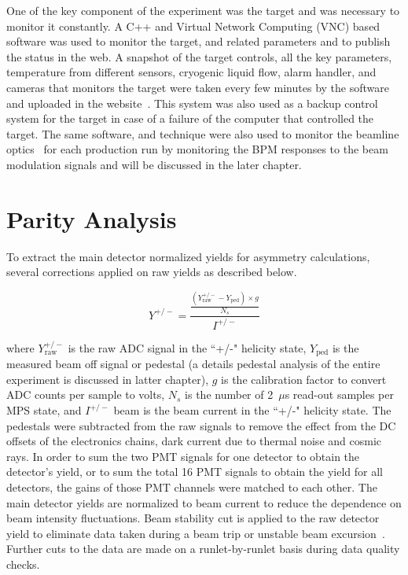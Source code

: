 One of the key component of the experiment was the target and was necessary to monitor it constantly. A C++ and Virtual Network Computing (VNC) based software was used to monitor the target, and related parameters and to publish the status in the web. 
A snapshot of the target controls, all the key parameters, temperature from different sensors, cryogenic liquid flow, alarm handler, and cameras that monitors the target were taken every few minutes by the software and uploaded in the website~\cite{website:target}. This system was also used as a backup control system for the target in case of a failure of the computer that controlled the target. 
The same software, and technique were also used to monitor the beamline optics~\cite{website:bmod} for each production run by monitoring the BPM responses to the beam modulation signals and will be discussed in the later chapter. 

\section{Parity Analysis}%
\label{Parity Analysis}


To extract the main detector normalized yields for asymmetry calculations, several corrections applied on raw yields as described below.

\begin{equation} \label{equ:yieldDefinition}
Y^{+/-} = \frac{\displaystyle \frac{(Y_{\textrm{raw}}^{+/-} - Y_{\textrm{ped}})\times g}{N_{s}} }{I^{+/-}}
\end{equation}

where $Y_{\textrm{raw}}^{+/-}$ is the raw ADC signal in the ``+/-" helicity state, $Y_{\textrm{ped}}$ is the measured beam off signal or pedestal (a details pedestal analysis of the entire experiment is discussed in latter chapter), $g$ is the calibration factor to convert ADC counts per sample to volts, $N_{s}$ is the number of 2~$\mu$s read-out samples per MPS state, and $I^{+/-}$ beam is the beam current in the ``+/-" helicity state. 
The pedestals were subtracted from the raw signals to remove the effect from the DC offsets of the electronics chains, dark current due to thermal noise and cosmic rays.
In order to sum the two PMT signals for one detector to obtain the detector’s yield, or to sum the total 16 PMT signals to obtain the yield for all detectors, the gains of those PMT channels were matched to each other. 
The main detector yields are normalized to beam current to reduce the dependence on beam intensity fluctuations.
Beam stability cut is applied to the raw detector yield to eliminate data taken during a beam trip or unstable beam excursion~\cite{rakitha_qweak}. Further cuts to the data are made on a runlet-by-runlet basis during data quality checks. 



